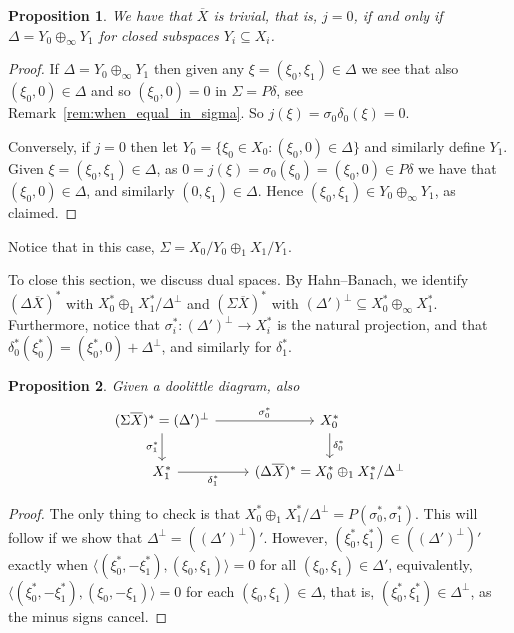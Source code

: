 \documentclass[a4paper,11pt]{article}
\theoremstyle{plain}
\newtheorem{proposition}{Proposition}[section]
\theoremstyle{remark}
\newcommand{\ip}[2]{{\langle {#1} , {#2} \rangle}}
\begin{document}
\begin{proposition}\label{prop:when_j_zero}
We have that $\overline X$ is trivial, that is, $j=0$, if and only if $\Delta = Y_0 \oplus_\infty Y_1$ for closed subspaces $Y_i \subseteq X_i$.
\end{proposition}
\begin{proof}
If $\Delta = Y_0 \oplus_\infty Y_1$ then given any $\xi=(\xi_0,\xi_1)\in \Delta$ we see that also $(\xi_0,0) \in \Delta$ and so $(\xi_0,0) = 0$ in $\Sigma = P\delta$, see Remark~\ref{rem:when_equal_in_sigma}.  So $j(\xi) = \sigma_0 \delta_0(\xi)=0$.

Conversely, if $j=0$ then let $Y_0 = \{ \xi_0\in X_0 : (\xi_0,0)\in \Delta \}$ and similarly define $Y_1$.  Given $\xi=(\xi_0,\xi_1)\in \Delta$, as $0 = j(\xi) = \sigma_0(\xi_0) = (\xi_0,0) \in P\delta$ we have that $(\xi_0,0) \in \Delta$, and similarly $(0,\xi_1)\in\Delta$.  Hence $(\xi_0,\xi_1) \in Y_0 \oplus_\infty Y_1$, as claimed.
\end{proof}

Notice that in this case, $\Sigma = X_0/Y_0 \oplus_1 X_1/Y_1$.

To close this section, we discuss dual spaces.  By Hahn--Banach, we identify $(\Delta\overline X)^*$ with $X_0^* \oplus_1 X_1^* / \Delta^\perp$ and $(\Sigma\overline X)^*$ with $(\Delta')^\perp \subseteq X_0^* \oplus_\infty X_1^*$.  Furthermore, notice that $\sigma_i^* \colon (\Delta')^\perp \to X_i^*$ is the natural projection, and that $\delta_0^*(\xi_0^*) = (\xi_0^*,0) + \Delta^\perp$, and similarly for $\delta_1^*$.

\begin{proposition}\label{prop:dual}
Given a doolittle diagram, also
\[ \begin{tikzcd}
(\Sigma\overline X)^* = (\Delta')^\perp  \arrow[r, "\sigma_0^*"] \arrow[d, "\sigma_1^*"'] & X_0^* \arrow[d, "\delta_0^*"]\\
X_1^* \arrow[r, "\delta_1^*"'] & (\Delta\overline X)^* = X_0^* \oplus_1 X_1^* / \Delta^\perp
\end{tikzcd} \]
\end{proposition}
\begin{proof}
The only thing to check is that $X_0^* \oplus_1 X_1^* / \Delta^\perp = P(\sigma_0^*, \sigma_1^*)$.  This will follow if we show that $\Delta^\perp = ((\Delta')^\perp)'$.  However, $(\xi_0^*, \xi_1^*) \in ((\Delta')^\perp)'$ exactly when $\ip{(\xi_0^*, -\xi_1^*)}{(\xi_0,\xi_1)}=0$ for all $(\xi_0,\xi_1) \in \Delta'$, equivalently, $\ip{(\xi_0^*, -\xi_1^*)}{(\xi_0,-\xi_1)}=0$ for each $(\xi_0,\xi_1)\in \Delta$, that is, $(\xi_0^*, \xi_1^*) \in \Delta^\perp$, as the minus signs cancel.
\end{proof}
\end{document}
